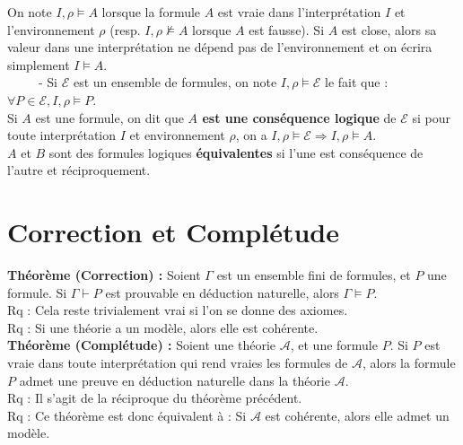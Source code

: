 \documentclass[11pt,a4paper]{article}
\begin{document}
On note $I,\rho	\models A$ lorsque la formule $A$ est vraie dans l'interprétation $I$ et l'environnement $\rho$ (resp.  $I,\rho \not\models A$ lorsque $A$ est fausse). Si $A$ est close, alors sa valeur dans une interprétation ne dépend pas de l’environnement et on écrira simplement $I \models A$. \\

\ \ \ \ \ - Si $\mathcal{E}$ est un ensemble de formules, on note $I,\rho \models \mathcal{E}$ le fait que : $\forall P \in \mathcal{E}, I,\rho \models P$. \\
Si $A$ est une formule, on dit que \textbf{$A$ est une conséquence logique} de $\mathcal{E}$ si pour toute interprétation $I$ et environnement $\rho$, on a $I, \rho \models \mathcal{E} \Rightarrow I,\rho \models A$. \\
$A$ et $B$ sont des formules logiques \textbf{équivalentes} si l'une est conséquence de l'autre et réciproquement. \\

\section{Correction et Complétude}

\textbf{Théorème (Correction) : }Soient $\Gamma$ est un ensemble fini de formules, et $P$ une formule. Si $ \Gamma \vdash P$ est prouvable en déduction naturelle, alors $\Gamma \models P$. \\
Rq : Cela reste trivialement vrai si l'on se donne des axiomes. \\
Rq : Si une théorie a un modèle, alors elle est cohérente. \\

\textbf{Théorème (Complétude) : }Soient une théorie $\mathcal{A}$, et une formule $P$. Si $P$ est vraie dans toute interprétation qui rend vraies les formules de $\mathcal{A}$, alors la formule $P$ 	admet une preuve en déduction naturelle dans la théorie $\mathcal{A}$. \\
Rq : Il s'agit de la réciproque du théorème précédent. \\
Rq : Ce théorème est donc équivalent à : Si $\mathcal{A}$ est cohérente, alors elle admet un modèle.
\end{document}
